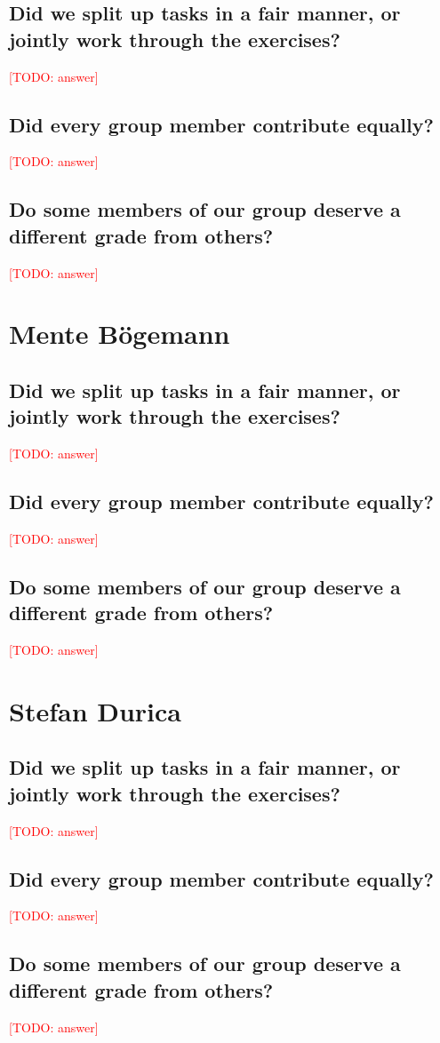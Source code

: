 \documentclass[11pt]{article}
\newcommand{\todo}[1]{\textcolor{red}{[TODO: #1]}}
\begin{document}
\subsection{Did we split up tasks in a fair manner, or jointly work through the exercises?}
\todo{answer}

\subsection{Did every group member contribute equally?}
\todo{answer}

\subsection{Do some members of our group deserve a different grade from others?}
\todo{answer}

\section{Mente B\"ogemann}

\subsection{Did we split up tasks in a fair manner, or jointly work through the exercises?}
\todo{answer}

\subsection{Did every group member contribute equally?}
\todo{answer}

\subsection{Do some members of our group deserve a different grade from others?}
\todo{answer}

\section{Stefan Durica}

\subsection{Did we split up tasks in a fair manner, or jointly work through the exercises?}
\todo{answer}

\subsection{Did every group member contribute equally?}
\todo{answer}

\subsection{Do some members of our group deserve a different grade from others?}
\todo{answer}
\end{document}

